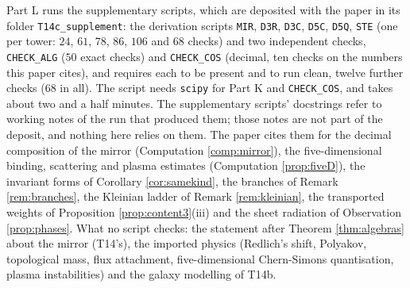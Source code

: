 \documentclass[11pt]{article}
\theoremstyle{definition}
\newcommand{\file}[1]{\texttt{#1}}
\begin{document}
Part L runs the supplementary scripts, which are deposited with the paper in its folder \file{T14c\_supplement}: the derivation scripts \file{MIR}, \file{D3R}, \file{D3C}, \file{D5C}, \file{D5Q}, \file{STE} (one per tower: $24$, $61$, $78$, $86$, $106$ and $68$ checks) and two independent checks, \file{CHECK\_ALG} ($50$ exact checks) and \file{CHECK\_COS} (decimal, ten checks on the numbers this paper cites), and requires each to be present and to run clean, twelve further checks ($68$ in all). The script needs \texttt{scipy} for Part K and \file{CHECK\_COS}, and takes about two and a half minutes. The supplementary scripts' docstrings refer to working notes of the run that produced them; those notes are not part of the deposit, and nothing here relies on them. The paper cites them for the decimal composition of the mirror (Computation \ref{comp:mirror}), the five-dimensional binding, scattering and plasma estimates (Computation \ref{prop:fiveD}), the invariant forms of Corollary \ref{cor:samekind}, the branches of Remark \ref{rem:branches}, the Kleinian ladder of Remark \ref{rem:kleinian}, the transported weights of Proposition \ref{prop:content3}(iii) and the sheet radiation of Observation \ref{prop:phases}. What no script checks: the statement after Theorem \ref{thm:algebras} about the mirror (T14's), the imported physics (Redlich's shift, Polyakov, topological mass, flux attachment, five-dimensional Chern-Simons quantisation, plasma instabilities) and the galaxy modelling of T14b.
\end{document}
